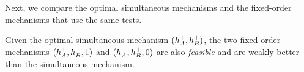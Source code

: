 Next, we compare the optimal simultaneous mechanisms and the fixed-order mechanisms that use the same tests. 
\begin{lemma}\label{lem:fix-simul}
    Given the optimal simultaneous mechanism  $(h_A^{+},h_B^{+})$, the two  fixed-order mechanisms $(h_A^{+},h_B^{+},1)$ and $(h_A^{+},h_B^{+},0)$ are also \emph{feasible} and  are weakly better than the simultaneous mechanism. 
\end{lemma}









